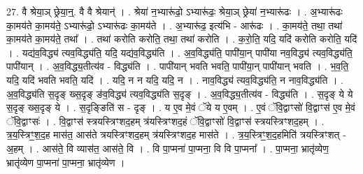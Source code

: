\documentclass[17pt]{extarticle}
\begin{document}
27. वै श्रेया॒ञ् छ्रेया॒न्॒. वै वै श्रेयान्॑ । . श्रेया॑ न॒भ्यारू॑ढो॒ ऽभ्यारू॑ढः॒ श्रेया॒ञ् छ्रेया॑ न॒भ्यारू॑ढः । . अ॒भ्यारू॑ढः का॒मय॑ते का॒मय॑ते॒ ऽभ्यारू॑ढो॒ ऽभ्यारू॑ढः का॒मय॑ते । . अ॒भ्यारू॑ढ॒ इत्य॑भि - आरू॑ढः । . का॒मय॑ते॒ तथा॒ तथा॑ का॒मय॑ते का॒मय॑ते॒ तथा᳚ । . तथा॑ करोति करोति॒ तथा॒ तथा॑ करोति । . क॒रो॒ति॒ यदि॒ यदि॑ करोति करोति॒ यदि॑ । . यद्य॑व॒विद्ध्य॑ त्यव॒विद्ध्य॑ति॒ यदि॒ यद्य॑व॒विद्ध्य॑ति । . अ॒व॒विद्ध्य॑ति॒ पापी॑या॒न् पापी॑या नव॒विद्ध्य॑ त्यव॒विद्ध्य॑ति॒ पापी॑यान् । . अ॒व॒विद्ध्य॒तीत्य॑व - विद्ध्य॑ति । . पापी॑यान् भवति भवति॒ पापी॑या॒न् पापी॑यान् भवति । . भ॒व॒ति॒ यदि॒ यदि॑ भवति भवति॒ यदि॑ । . यदि॒ न न यदि॒ यदि॒ न । . नाव॒विद्ध्य॑ त्यव॒विद्ध्य॑ति॒ न नाव॒विद्ध्य॑ति । . अ॒व॒विद्ध्य॑ति स॒दृङ् ख्स॒दृङ् ङ॑व॒विद्ध्य॑ त्यव॒विद्ध्य॑ति स॒दृङ् । . अ॒व॒विद्ध्य॒तीत्य॑व - विद्ध्य॑ति । . स॒दृङ् ये ये स॒दृङ् ख्स॒दृङ् ये । . स॒दृङ्ङिति॑ स - दृङ् । . य ए॒व मे॒वं ॅये य ए॒वम् । . ए॒वं ॅवि॒द्वाꣳसो॑ वि॒द्वाꣳस॑ ए॒व मे॒वं ॅवि॒द्वाꣳसः॑ । . वि॒द्वाꣳस॑ स्त्रयस्त्रिꣳशद॒हम् त्र॑यस्त्रिꣳशद॒हं ॅवि॒द्वाꣳसो॑ वि॒द्वाꣳस॑ स्त्रयस्त्रिꣳशद॒हम् । . त्र॒य॒स्त्रिꣳ॒॒श॒द॒ह मास॑त॒ आस॑ते त्रयस्त्रिꣳशद॒हम् त्र॑यस्त्रिꣳशद॒ह मास॑ते । . त्र॒य॒स्त्रिꣳ॒॒श॒द॒हमिति॑ त्रयस्त्रिꣳशत् - अ॒हम् । . आस॑ते॒ वि व्यास॑त॒ आस॑ते॒ वि । . वि पा॒प्मना॑ पा॒प्मना॒ वि वि पा॒प्मना᳚ । . पा॒प्मना॒ भ्रातृ॑व्येण॒ भ्रातृ॑व्येण पा॒प्मना॑ पा॒प्मना॒ भ्रातृ॑व्येण । \newline
\end{document}
